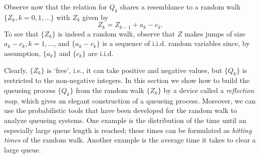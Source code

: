 Observe now that the relation for $Q_k$ shares a resemblance to a random walk $\{Z_k, k=0,1,\ldots\}$ with  $Z_k$ given by
\begin{equation}\label{eq:44}
  Z_k = Z_{k-1} + a_k - c_k.
\end{equation}
To see that $\{Z_k\}$ is indeed a random walk, observe that $Z$ makes  jumps of size $a_k-c_k, k=1,\ldots$, and $\{a_k-c_k\}$ is a sequence of i.i.d. random variables since, by assumption,  $\{a_k\}$ and $\{c_k\}$ are i.i.d.

Clearly, $\{Z_k\}$ is `free', i.e., it can take positive and negative
values, but $\{Q_k\}$ is restricted to the non-negative integers.  In
this section we show how to build the queueing process $\{Q_k\}$ from
the random walk $\{Z_k\}$ by a device called a \emph{reflection map}, which gives an  elegant construction of a queueing process. Moreover, we can use the probabilistic
tools that have been developed for the random walk to analyze queueing
systems. One example is the distribution of the time until an
especially large queue length is reached; these times can be
formulated as \emph{hitting times} of the random walk. Another example
is the average time it takes to clear a large queue.

